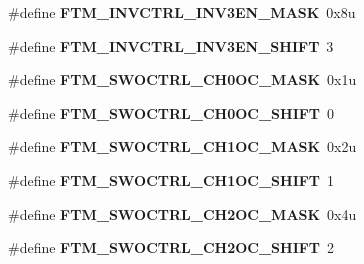 \begin{DoxyCompactItemize}
\item 
\#define {\bfseries F\+T\+M\+\_\+\+I\+N\+V\+C\+T\+R\+L\+\_\+\+I\+N\+V3\+E\+N\+\_\+\+M\+A\+SK}~0x8u\hypertarget{group__FTM__Register__Masks_ga1f9f536afb4e0b9b5041f35b51dc0008}{}\label{group__FTM__Register__Masks_ga1f9f536afb4e0b9b5041f35b51dc0008}

\item 
\#define {\bfseries F\+T\+M\+\_\+\+I\+N\+V\+C\+T\+R\+L\+\_\+\+I\+N\+V3\+E\+N\+\_\+\+S\+H\+I\+FT}~3\hypertarget{group__FTM__Register__Masks_gaeaa778d3ec63bd86c6a5e840eebfcbe7}{}\label{group__FTM__Register__Masks_gaeaa778d3ec63bd86c6a5e840eebfcbe7}

\item 
\#define {\bfseries F\+T\+M\+\_\+\+S\+W\+O\+C\+T\+R\+L\+\_\+\+C\+H0\+O\+C\+\_\+\+M\+A\+SK}~0x1u\hypertarget{group__FTM__Register__Masks_ga1d6ba2b311aaea0d8857a2eff1a79f9b}{}\label{group__FTM__Register__Masks_ga1d6ba2b311aaea0d8857a2eff1a79f9b}

\item 
\#define {\bfseries F\+T\+M\+\_\+\+S\+W\+O\+C\+T\+R\+L\+\_\+\+C\+H0\+O\+C\+\_\+\+S\+H\+I\+FT}~0\hypertarget{group__FTM__Register__Masks_ga8a9c262029f5302d089e536c8c44b499}{}\label{group__FTM__Register__Masks_ga8a9c262029f5302d089e536c8c44b499}

\item 
\#define {\bfseries F\+T\+M\+\_\+\+S\+W\+O\+C\+T\+R\+L\+\_\+\+C\+H1\+O\+C\+\_\+\+M\+A\+SK}~0x2u\hypertarget{group__FTM__Register__Masks_gab033c2350b9eb73407eea7d5be5902bc}{}\label{group__FTM__Register__Masks_gab033c2350b9eb73407eea7d5be5902bc}

\item 
\#define {\bfseries F\+T\+M\+\_\+\+S\+W\+O\+C\+T\+R\+L\+\_\+\+C\+H1\+O\+C\+\_\+\+S\+H\+I\+FT}~1\hypertarget{group__FTM__Register__Masks_ga91d92f8443196bd3f816110707c70355}{}\label{group__FTM__Register__Masks_ga91d92f8443196bd3f816110707c70355}

\item 
\#define {\bfseries F\+T\+M\+\_\+\+S\+W\+O\+C\+T\+R\+L\+\_\+\+C\+H2\+O\+C\+\_\+\+M\+A\+SK}~0x4u\hypertarget{group__FTM__Register__Masks_gafb399bfe91227e3c1ef409df4f3296b9}{}\label{group__FTM__Register__Masks_gafb399bfe91227e3c1ef409df4f3296b9}

\item 
\#define {\bfseries F\+T\+M\+\_\+\+S\+W\+O\+C\+T\+R\+L\+\_\+\+C\+H2\+O\+C\+\_\+\+S\+H\+I\+FT}~2\hypertarget{group__FTM__Register__Masks_gabafc3c919320572e1474319804e13958}{}\label{group__FTM__Register__Masks_gabafc3c919320572e1474319804e13958}


\end{DoxyCompactItemize}
